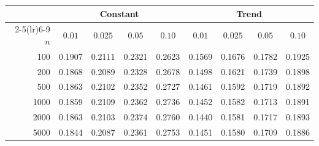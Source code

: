 \begin{tabular}{rcccccccc}
\toprule
& \multicolumn{4}{c}{Constant} & \multicolumn{4}{c}{Trend}\\
\cmidrule(lr){2-5}\cmidrule(lr){6-9}
$n$ & $0.01$ & $0.025$ & $0.05$ & $0.10$ & $0.01$ & $0.025$ & $0.05$ & $0.10$\\
\midrule
100 & 0.1907 & 0.2111 & 0.2321 & 0.2623 & 0.1569 & 0.1676 & 0.1782 & 0.1925 \\
200 & 0.1868 & 0.2089 & 0.2328 & 0.2678 & 0.1498 & 0.1621 & 0.1739 & 0.1898 \\
500 & 0.1863 & 0.2102 & 0.2352 & 0.2727 & 0.1461 & 0.1592 & 0.1719 & 0.1892 \\
1000 & 0.1859 & 0.2109 & 0.2362 & 0.2736 & 0.1452 & 0.1582 & 0.1713 & 0.1891 \\
2000 & 0.1863 & 0.2103 & 0.2374 & 0.2760 & 0.1440 & 0.1581 & 0.1717 & 0.1893 \\
5000 & 0.1844 & 0.2087 & 0.2361 & 0.2753 & 0.1451 & 0.1580 & 0.1709 & 0.1886 \\
\bottomrule
\end{tabular}

